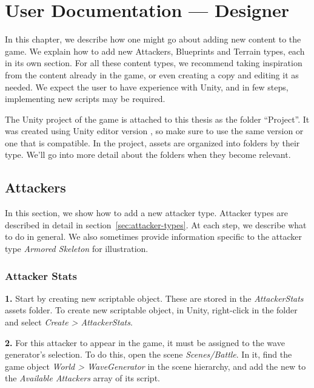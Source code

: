 \chapter{User Documentation --- Designer}

In this chapter, we describe how one might go about adding new content to the game.
We explain how to add new Attackers, Blueprints and Terrain types, each in its own section.
For all these content types, we recommend taking inspiration from the content already in the game, or even creating a copy and editing it as needed.
We expect the user to have experience with Unity, and in few steps, implementing new scripts may be required.

The Unity project of the game is attached to this thesis as the folder \enquote{Project}.
It was created using Unity editor version , so make sure to use the same version or one that is compatible.
In the project, assets are organized into folders by their type.
We'll go into more detail about the folders when they become relevant.

\section{Attackers}

In this section, we show how to add a new attacker type.
Attacker types are described in detail in section~\ref{sec:attacker-types}.
At each step, we describe what to do in general.
We also sometimes provide information specific to the attacker type \emph{Armored Skeleton} for illustration.

\subsection{Attacker Stats}

\textbf{1.}
Start by creating new  scriptable object.
These are stored in the \emph{AttackerStats} assets folder.
To create new  scriptable object, in Unity, right-click in the folder and select \emph{Create > AttackerStats}.

\textbf{2.}
For this attacker to appear in the game, it must be assigned to the wave generator's selection.
To do this, open the scene \emph{Scenes/Battle}.
In it, find the game object \emph{World > WaveGenerator} in the scene hierarchy, and add the new  to the \emph{Available Attackers} array of its  script.

